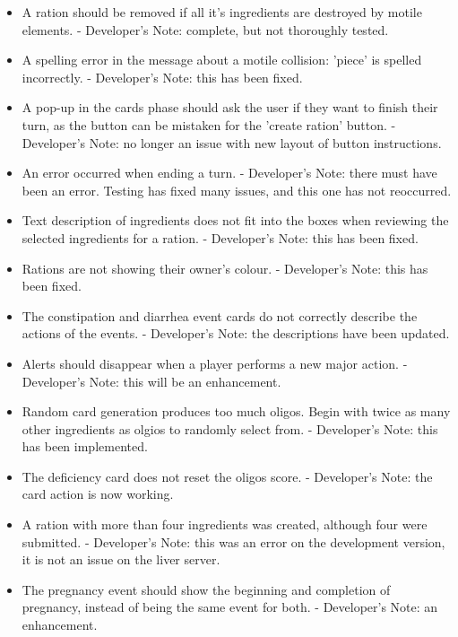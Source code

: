 \begin{itemize}
	\item A ration should be removed if all it's ingredients are destroyed by motile elements. - Developer's Note: complete, but not thoroughly tested.
	\item A spelling error in the message about a motile collision: 'piece' is spelled incorrectly. - Developer's Note: this has been fixed.
	\item A pop-up in the cards phase should ask the user if they want to finish their turn, as the button can be mistaken for the 'create ration' button. - Developer's Note: no longer an issue with new layout of button instructions.
	\item An error occurred when ending a turn. - Developer's Note: there must have been an error. Testing has fixed many issues, and this one has not reoccurred.
	\item Text description of ingredients does not fit into the boxes when reviewing the selected ingredients for a ration. - Developer's Note: this has been fixed.
	\item Rations are not showing their owner's colour. - Developer's Note: this has been fixed.
	\item The constipation and diarrhea event cards do not correctly describe the actions of the events. - Developer's Note: the descriptions have been updated.
	\item Alerts should disappear when a player performs a new major action. - Developer's Note: this will be an enhancement.
	\item Random card generation produces too much oligos. Begin with twice as many other ingredients as olgios to randomly select from. - Developer's Note: this has been implemented.
	\item The deficiency card does not reset the oligos score. - Developer's Note: the card action is now working.
	\item A ration with more than four ingredients was created, although four were submitted. - Developer's Note: this was an error on the development version, it is not an issue on the liver server.
	\item The pregnancy event should show the beginning and completion of pregnancy, instead of being the same event for both. - Developer's Note: an enhancement.
\end{itemize}

